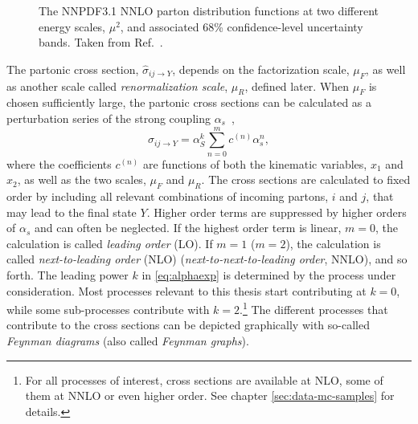 \begin{figure}
  \caption[The NNPDF3.1 NNLO parton distribution functions at two different energy scales.]{The NNPDF3.1 NNLO parton distribution functions at two different energy scales, $\mu^2$, and associated 68\% confidence-level uncertainty bands. Taken from Ref.~\cite{2017NNPDF}.}
  \label{fig:pdfs}
\end{figure}

The partonic cross section, $\hat{\sigma}_{ij \rightarrow Y}$, depends on the factorization scale, $\mu_F$, as well as another scale called \emph{renormalization scale}, $\mu_R$, defined later.
When $\mu_F$ is chosen sufficiently large, the partonic cross sections can be calculated as a perturbation series of the strong coupling $\alpha_s$~\cite{Ellis:1991qj},
\begin{equation}
  \hat{\sigma}_{ij \rightarrow Y} = \alpha^k_S \sum_{n=0}^{m} c^{(n)}\alpha_s^n,
  \label{eq:alphaexp}
\end{equation}
where the coefficients $c^{(n)}$ are functions of both the kinematic variables, $x_1$ and $x_2$, as well as the two scales, $\mu_F$ and $\mu_R$. The cross sections are calculated to fixed order by including all relevant combinations of incoming partons, $i$ and $j$, that may lead to the final state $Y$. Higher order terms are suppressed by higher orders of $\alpha_s$ and can often be neglected.
If the highest order term is linear, $m=0$, the calculation is called \emph{leading order} (LO). If $m=1$ ($m=2$), the calculation is called \emph{next-to-leading order} (NLO) (\emph{next-to-next-to-leading order}, NNLO), and so forth. 
The leading power $k$ in \cref{eq:alphaexp} is determined by the process under consideration. Most processes relevant to this thesis start contributing at $k=0$, while some sub-processes contribute with $k=2$.\footnote{For all processes of interest, cross sections are available at NLO, some of them at NNLO or even higher order. See chapter \cref{sec:data-mc-samples} for details.}
The different processes that contribute to the cross sections can be depicted graphically with so-called \emph{Feynman diagrams} (also called \emph{Feynman graphs}). 
